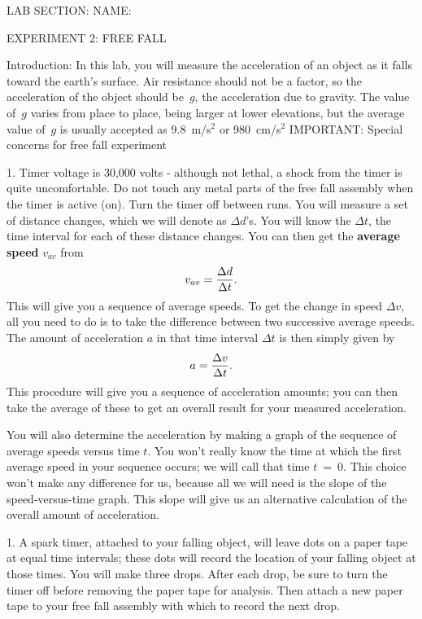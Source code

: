 \baselineskip=15pt
\vglue-0.7in
\hglue-2.0cm LAB SECTION:
\underbar{~~~~~~~~~~~~~~~~~~~~~~~~~~~~~~~~~~~~~~~~~~~~~~}
 NAME:
\rlap{
\underbar{~~~~~~~~~~~~~~~~~~~~~~~~~~~~~~~~~~~~~~~~~~~~~~}
}
\bigskip
\bigskip
\bigskip
\centerline{EXPERIMENT 2: FREE FALL}
\bigskip
Introduction: In this lab, you will measure the acceleration
of an object as it falls toward the earth's surface.  Air
resistance should not be a factor, so the acceleration of the
object should be~$g$, the acceleration due to gravity.  The 
value of~$g$ varies from place to place, being larger at 
lower elevations, but the average value of~$g$ is usually 
accepted as 9.8~m/s$^2$ or 980~cm/s$^2$
\bigskip
IMPORTANT: Special concerns for free fall experiment
\item{1.} Timer voltage is 30,000 volts - although not lethal,
a shock from the timer is quite uncomfortable.  Do not touch
any metal parts of the free fall assembly when the timer is
active (on).  Turn the timer off between runs.
\bigskip
You will measure a set of distance changes, which we will 
denote as $\Delta d$'s.  You will know the $\Delta t$, the
time interval for each of these distance changes.  You
can then get the {\bf average speed} $v_{av}$ from
$$v_{av} = {\Delta d\over \Delta t}.$$
This will give you a sequence of average speeds.  To
get the change in speed $\Delta v$, all you need to
do is to take the difference between two successive
average speeds.  The amount of acceleration $a$ in that
time interval $\Delta t$ is then simply given by
$$ a = {\Delta v\over \Delta t}.$$
This procedure will give you a sequence of acceleration
amounts; you can then take the average of these to get
an overall result for your measured acceleration.

You will also determine the acceleration by making
a graph of the sequence of average speeds versus time $t$.
You won't really know the time at which the first average
speed in your sequence occurs; we will call that time 
$t$~=~0.  This choice won't make any difference for us, 
because all we will need is the slope of the 
speed-versus-time graph.  This slope will give us an 
alternative calculation of the overall amount of 
acceleration.
\bigskip
{}
\smallskip
\item{1.} A spark timer, attached to your falling object, 
will leave dots on a paper tape at equal time intervals; 
these dots will record the location of your falling object 
at those times.  You will make three drops.  After each
drop, be sure to turn the timer off before removing the
paper tape for analysis.  Then attach a new paper tape
to your free fall assembly with which to record the next
drop.

